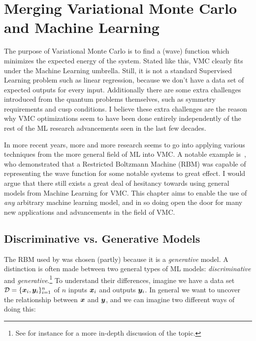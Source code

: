 \documentclass[Thesis.tex]{subfiles}
\begin{document}
\chapter{Merging Variational Monte Carlo and Machine Learning}
\label{chp:mergin-vmc-with-ml}

The purpose of Variational Monte Carlo is to find a (wave) function which minimizes
the expected energy of the system. Stated like this, VMC clearly fits under the
Machine Learning umbrella. Still, it is not a standard Supervised Learning
problem such as linear regression, because we don't have a data set of expected
outputs for every input. Additionally there are some extra challenges introduced
from the quantum problems themselves, such as symmetry requirements and cusp
conditions. I believe these extra challenges are the reason why VMC
optimizations seem to have been done entirely independently of the rest of the
ML research advancements seen in the last few decades.

In more recent years, more and more research seems to go into applying various
techniques from the more general field of ML into VMC. A notable example
is~\textcite{Carleo602}, who demonstrated that a Restricted Boltzmann Machine
(RBM) was capable of representing the wave function for some notable systems to
great effect. I would argue that there still exists a great deal of hesitancy
towards using general models from Machine Learning for VMC. This chapter aims to
enable the use of \emph{any} arbitrary machine learning
model, and in so doing open the door for many new applications and advancements
in the field of VMC.


\section{Discriminative vs. Generative Models}


The RBM used by \textcite{Carleo602} was chosen (partly) because it is a
\emph{generative} model. A distinction is often made between two general types
of ML models:
\emph{discriminative} and \emph{generative}.\footnote{See for instance \textcite{Ng-2001} for
a more in-depth discussion of the topic.} To understand their differences,
imagine we have a data set $\mathcal{D} = \{\bm{x}_i, \bm{y}_i\}_{i=1}^n$ of $n$
inputs $\bm{x}_i$ and outputs $\bm{y}_i$. In general we want to uncover the
relationship between $\bm{x}$ and $\bm{y}$, and we can imagine two different ways of
doing this:
\end{document}
